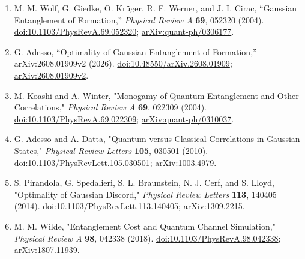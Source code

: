 \begin{enumerate}[label={},leftmargin=4.8em,labelsep=0.5em]
  \footnotesize
  \item[\textup{[WGKWC04]}]\label{ref:p26-wolf}
  M. M. Wolf, G. Giedke, O. Kr\"uger, R. F. Werner, and J. I. Cirac,
  ``Gaussian Entanglement of Formation,'' \emph{Physical Review A}
  \textbf{69}, 052320 (2004).
  \href{https://doi.org/10.1103/PhysRevA.69.052320}{doi:10.1103/PhysRevA.69.052320};
  \href{https://arxiv.org/abs/quant-ph/0306177}{arXiv:quant-ph/0306177}.

  \item[\textup{[Ade26]}]\label{ref:p26-adesso}
  G. Adesso, ``Optimality of Gaussian Entanglement of Formation,''
  arXiv:2608.01909v2 (2026).
  \href{https://doi.org/10.48550/arXiv.2608.01909}{doi:10.48550/arXiv.2608.01909};
  \href{https://arxiv.org/abs/2608.01909v2}{arXiv:2608.01909v2}.

  \item[\textup{[KW04]}]\label{ref:p26-koashi}
  M. Koashi and A. Winter, "Monogamy of Quantum Entanglement and Other Correlations," \emph{Physical Review A} \textbf{69}, 022309 (2004). \href{https://doi.org/10.1103/PhysRevA.69.022309}{doi:10.1103/PhysRevA.69.022309}; \href{https://arxiv.org/abs/quant-ph/0310037}{arXiv:quant-ph/0310037}.

  \item[\textup{[AD10]}]\label{ref:p26-discord}
  G. Adesso and A. Datta, "Quantum versus Classical Correlations in Gaussian States," \emph{Physical Review Letters} \textbf{105}, 030501 (2010). \href{https://doi.org/10.1103/PhysRevLett.105.030501}{doi:10.1103/PhysRevLett.105.030501}; \href{https://arxiv.org/abs/1003.4979}{arXiv:1003.4979}.

  \item[\textup{[PSBCL14]}]\label{ref:p26-optimal}
  S. Pirandola, G. Spedalieri, S. L. Braunstein, N. J. Cerf, and S. Lloyd, "Optimality of Gaussian Discord," \emph{Physical Review Letters} \textbf{113}, 140405 (2014). \href{https://doi.org/10.1103/PhysRevLett.113.140405}{doi:10.1103/PhysRevLett.113.140405}; \href{https://arxiv.org/abs/1309.2215}{arXiv:1309.2215}.

  \item[\textup{[Wil18]}]\label{ref:p26-wilde}
  M. M. Wilde, "Entanglement Cost and Quantum Channel Simulation," \emph{Physical Review A} \textbf{98}, 042338 (2018). \href{https://doi.org/10.1103/PhysRevA.98.042338}{doi:10.1103/PhysRevA.98.042338}; \href{https://arxiv.org/abs/1807.11939}{arXiv:1807.11939}.
\end{enumerate}

